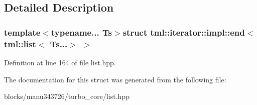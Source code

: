 \subsection{Detailed Description}
\subsubsection*{template$<$typename... Ts$>$struct tml\+::iterator\+::impl\+::end$<$ tml\+::list$<$ Ts...$>$ $>$}



Definition at line 164 of file list.\+hpp.



The documentation for this struct was generated from the following file\+:\begin{DoxyCompactItemize}
\item 
blocks/manu343726/turbo\+\_\+core/list.\+hpp\end{DoxyCompactItemize}
